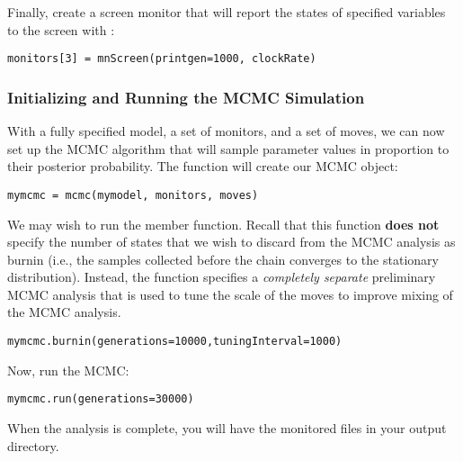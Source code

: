 Finally, create a screen monitor that will report the states of specified variables to the screen with :
{\tt \begin{snugshade*}
\begin{lstlisting}
monitors[3] = mnScreen(printgen=1000, clockRate)
\end{lstlisting}
\end{snugshade*}}

\subsubsection{Initializing and Running the MCMC Simulation}

With a fully specified model, a set of monitors, and a set of moves, we can now set up the MCMC algorithm that will sample parameter values in proportion to their posterior probability. The  function will create our MCMC object:
{\tt \begin{snugshade*}
\begin{lstlisting}
mymcmc = mcmc(mymodel, monitors, moves)
\end{lstlisting}
\end{snugshade*}}


We may wish to run the  member function.
Recall that this function \textbf{does not} specify the number of states that we wish to discard from the MCMC analysis as burnin (i.e., the samples collected before the chain converges to the stationary distribution).  
Instead, the  function specifies a \textit{completely separate} preliminary MCMC analysis that is used to tune the scale of the moves to improve mixing of the MCMC analysis.
{\tt \begin{snugshade*}
\begin{lstlisting}
mymcmc.burnin(generations=10000,tuningInterval=1000)
\end{lstlisting}
\end{snugshade*}}


Now, run the MCMC:
{\tt \begin{snugshade*}
\begin{lstlisting}
mymcmc.run(generations=30000)
\end{lstlisting}
\end{snugshade*}}

When the analysis is complete, you will have the monitored files in your output directory.

